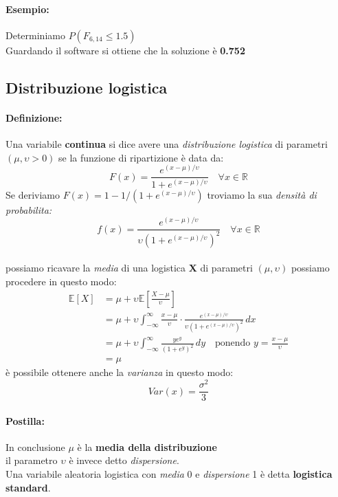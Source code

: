 \documentclass[]{article}
\newcommand{\ev}{\mathbb{E}[X]}
\renewcommand{\ev}[1]{\mathbb{E}[#1]}
\newcommand{\definizione}{\paragraph{Definizione:}}
\begin{document}
    \paragraph{Esempio:} Determiniamo $P(F_{6, 14} \leq 1.5)$ \\
    Guardando il software si ottiene che la soluzione è \textbf{0.752}

    \subsection{Distribuzione logistica}
    \definizione Una variabile \textbf{continua} si dice avere una \textit{distribuzione logistica} di parametri $(\mu, \upsilon > 0 )$ se la funzione di ripartizione è data da:
    \[ F(x) = \frac{e^{(x-\mu)/\upsilon}}{1 + e^{(x-\mu)/\upsilon}} \quad \forall x \in \mathbb{R} \]
    Se deriviamo $F(x) = 1 - 1/(1+e^{(x-\mu)/\upsilon})$ troviamo la sua \textit{densità di probabilita:}
    \[ f(x) = \frac{e^{(x-\mu)/\upsilon}}{\upsilon(1 + e^{(x-\mu)/\upsilon})^2} \quad \forall x \in \mathbb{R} \] \\
    possiamo ricavare la \textit{media} di una logistica \textbf{X} di parametri $(\mu, \upsilon)$ possiamo procedere in questo modo:
    \begin{equation*}
        \begin{split}
            \ev{X} &= \mu + \upsilon \ev{\frac{X - \mu}{\upsilon}} \\
            &= \mu + \upsilon \int_{-\infty}^{\infty} \frac{x- \mu}{\upsilon} \cdot \frac{e^{(x-\mu)/\upsilon}}{\upsilon(1+e^{(x - \mu)/\upsilon})^2} \, dx \\
            &= \mu + \upsilon \int_{-\infty}^{\infty} \frac{ye^y}{(1+e^y)^2} \, dy \quad \text{ponendo } y=\frac{x - \mu}{\upsilon} \\
            &= \mu
        \end{split}
    \end{equation*}
    è possibile ottenere anche la \textit{varianza} in questo modo:
    \[ Var(x) = \frac{\sigma^2}{3}\]
    \paragraph{Postilla:} In conclusione $\mu$ è la \textbf{media della distribuzione}\\ 
    il parametro $\upsilon$ è invece detto \textit{dispersione}. \\ 
    Una variabile aleatoria logistica con \textit{media} 0 e \textit{dispersione} 1 è detta
    \textbf{logistica standard}.
\end{document}
